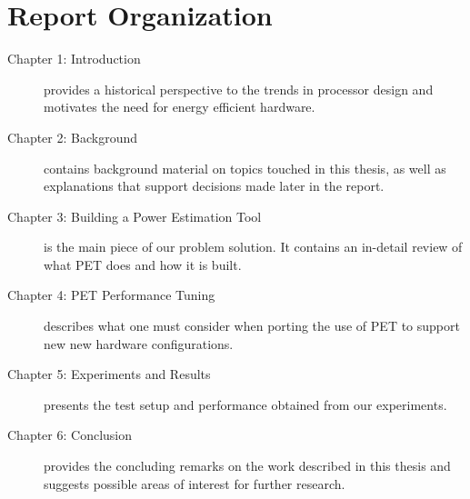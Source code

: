 \section{Report Organization}


\begin{description}
    \item[Chapter 1: Introduction] provides a historical perspective to the
        trends in processor design and motivates the need for energy efficient
        hardware.
    \item[Chapter 2: Background] contains background material on topics touched
        in this thesis, as well as explanations that support decisions made
        later in the report.
    \item[Chapter 3: Building a Power Estimation Tool] is the main piece of our
        problem solution. It contains an in-detail review of what PET does and
        how it is built.
    \item[Chapter 4: PET Performance Tuning] describes what one must consider
        when porting the use of PET to support new new hardware configurations.
    \item[Chapter 5: Experiments and Results] presents the test setup and
        performance obtained from our experiments.
    \item[Chapter 6: Conclusion] provides the concluding remarks on the work
        described in this thesis and suggests possible areas of interest for
        further research.
\end{description}

